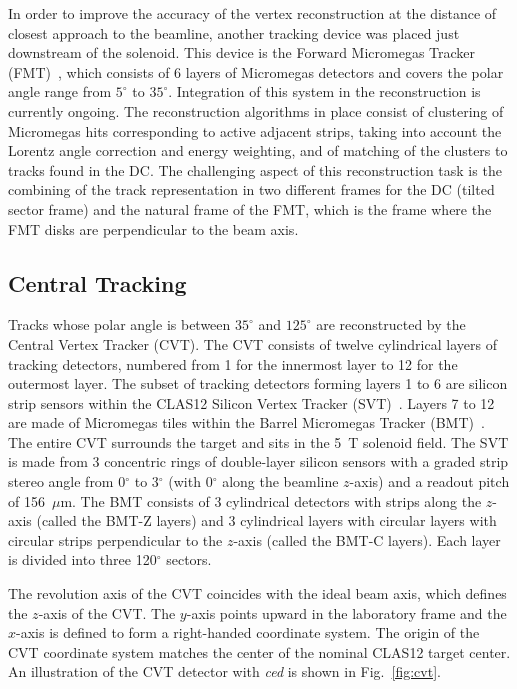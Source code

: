 In order to improve the accuracy of the vertex reconstruction at the distance of closest approach to the beamline,
another tracking device was placed just downstream of the solenoid.  This device is the Forward Micromegas Tracker
(FMT)~\cite{mm-nim}, which consists of 6 layers of Micromegas detectors and covers the polar angle range from
$5^\circ$ to $35^\circ$. Integration of this system in the reconstruction is currently ongoing. The reconstruction
algorithms in place consist of clustering of Micromegas hits corresponding to active adjacent strips, taking into
account the Lorentz angle correction and energy weighting, and of matching of the clusters to tracks found in the DC.
The challenging aspect of this reconstruction task is the combining of the track representation in two different
frames for the DC (tilted sector frame) and the natural frame of the FMT, which is the frame where the FMT disks
are perpendicular to the beam axis. 

\subsection{Central Tracking}
\label{sec:cvt}

Tracks whose polar angle is between $35^\circ$ and $125^\circ$ are reconstructed by the Central Vertex Tracker
(CVT). The CVT consists of twelve cylindrical layers of tracking detectors, numbered from 1 for the innermost layer
to 12 for the outermost layer. The subset of tracking detectors forming layers 1 to 6 are silicon strip sensors within
the CLAS12 Silicon Vertex Tracker (SVT)~\cite{svt-nim}. Layers 7 to 12 are made of Micromegas tiles within the
Barrel Micromegas Tracker (BMT)~\cite{mm-nim}. The entire CVT surrounds the target and sits in the 5~T solenoid
field. The SVT is made from 3 concentric rings of double-layer silicon sensors with a graded strip stereo angle from
0$^\circ$ to 3$^\circ$ (with 0$^\circ$ along the beamline $z$-axis) and a readout pitch of 156~$\mu$m. The BMT
consists of 3 cylindrical detectors with strips along the $z$-axis (called the BMT-Z layers) and 3 cylindrical layers
with circular layers with circular strips perpendicular to the $z$-axis (called the BMT-C layers). Each layer is divided
into three 120$^\circ$ sectors.

The revolution axis of the CVT coincides with the ideal beam axis, which defines the $z$-axis of the CVT. The
$y$-axis points upward in the laboratory frame and the $x$-axis is defined to form a right-handed coordinate
system. The origin of the CVT coordinate system matches the center of the nominal CLAS12 target center. An
illustration of the CVT detector with {\it ced} is shown in Fig.~\ref{fig:cvt}.

